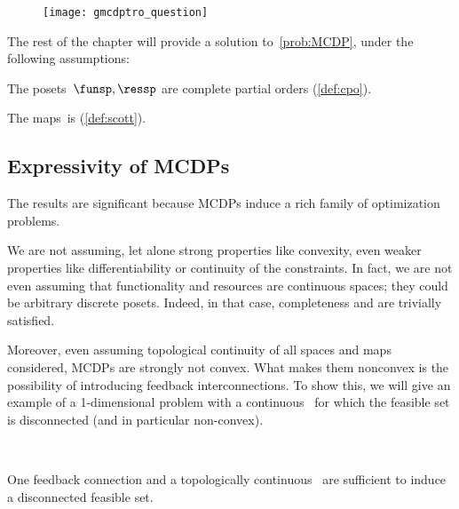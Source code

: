 \begin{figure}
    \texttt{[image: gmcdptro\_question]}
    \caption{}
    \label{fig:question}
\end{figure}


The rest of the chapter will provide a solution to~\cref{prob:MCDP},
under the following assumptions:

\begin{compactenum}
    \item The posets~$\funsp,\ressp$ are complete partial orders (\cref{def:cpo}).
    \item The maps~\ftor is \scottcontinuous (\cref{def:scott}).
\end{compactenum}

\subsection{Expressivity of MCDPs}
The results are significant because MCDPs induce a rich family of
optimization problems.

We are not assuming, let alone strong properties like convexity, even
weaker properties like differentiability or continuity of the constraints.
In fact, we are not even assuming that functionality and resources
are continuous spaces; they could be arbitrary discrete posets.
Indeed, in that case, completeness and \scottcontinuity are trivially satisfied.


Moreover, even assuming topological continuity of all spaces and maps
considered, MCDPs are strongly not convex. What makes them nonconvex
is the possibility of introducing feedback interconnections. To show
this, we will give an example of a 1-dimensional problem with a continuous~\ftor
for which the feasible set is disconnected (and in particular non-convex).

\begin{marginfigure}
    \centering
    \\
    \caption{One feedback connection and a topologically continuous~\ftor
    are sufficient to induce a disconnected feasible set.}
    \label{fig:ceil-1}
\end{marginfigure}



